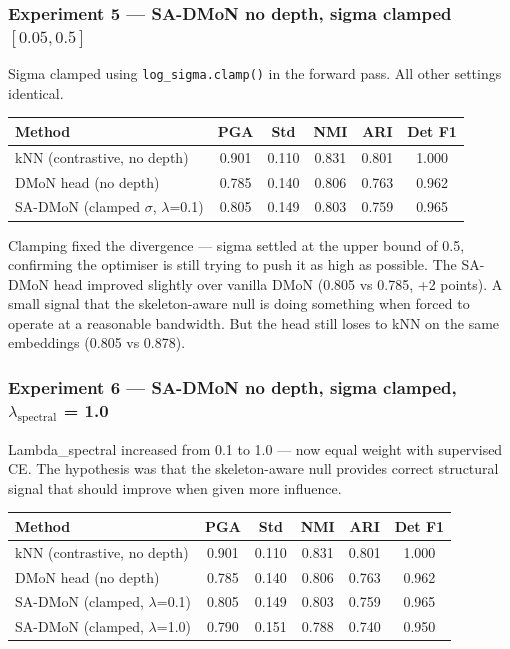 \subsubsection{Experiment 5 --- SA-DMoN no depth, sigma clamped $[0.05, 0.5]$}

Sigma clamped using \texttt{log\_sigma.clamp()} in the forward pass. All other settings identical.

\begin{center}
\begin{tabular}{lccccc}
\toprule
Method & PGA & Std & NMI & ARI & Det F1 \\
\midrule
kNN (contrastive, no depth) & 0.901 & 0.110 & 0.831 & 0.801 & 1.000 \\
DMoN head (no depth) & 0.785 & 0.140 & 0.806 & 0.763 & 0.962 \\
SA-DMoN (clamped $\sigma$, $\lambda$=0.1) & 0.805 & 0.149 & 0.803 & 0.759 & 0.965 \\
\bottomrule
\end{tabular}
\end{center}

Clamping fixed the divergence --- sigma settled at the upper bound of 0.5, confirming the optimiser is still trying to push it as high as possible. The SA-DMoN head improved slightly over vanilla DMoN (0.805 vs 0.785, +2 points). A small signal that the skeleton-aware null is doing something when forced to operate at a reasonable bandwidth. But the head still loses to kNN on the same embeddings (0.805 vs 0.878).


\subsubsection{Experiment 6 --- SA-DMoN no depth, sigma clamped, $\lambda_{\text{spectral}}$ = 1.0}

Lambda\_spectral increased from 0.1 to 1.0 --- now equal weight with supervised CE. The hypothesis was that the skeleton-aware null provides correct structural signal that should improve when given more influence.

\begin{center}
\begin{tabular}{lccccc}
\toprule
Method & PGA & Std & NMI & ARI & Det F1 \\
\midrule
kNN (contrastive, no depth) & 0.901 & 0.110 & 0.831 & 0.801 & 1.000 \\
DMoN head (no depth) & 0.785 & 0.140 & 0.806 & 0.763 & 0.962 \\
SA-DMoN (clamped, $\lambda$=0.1) & 0.805 & 0.149 & 0.803 & 0.759 & 0.965 \\
SA-DMoN (clamped, $\lambda$=1.0) & 0.790 & 0.151 & 0.788 & 0.740 & 0.950 \\
\bottomrule
\end{tabular}
\end{center}

